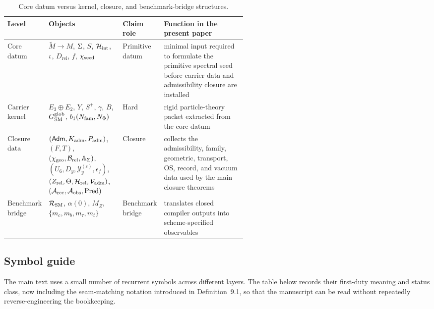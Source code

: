 \begin{table}[t]
\centering
\small
\begin{tabularx}{\linewidth}{@{}>{\raggedright\arraybackslash}p{0.12\linewidth}>{\raggedright\arraybackslash}p{0.31\linewidth}>{\raggedright\arraybackslash}p{0.13\linewidth}Y@{}}
\toprule
Level & Objects & Claim role & Function in the present paper \\
\midrule
Core datum & $\widetilde M\to M$, $\Sigma$, $S$, $\mathcal H_{\mathrm{int}}$, $\iota$, $D_{\mathrm{rel}}$, $f$, $\chi_{\mathrm{seed}}$ & Primitive datum & minimal input required to formulate the primitive spectral seed before carrier data and admissibility closure are installed \\
Carrier kernel & $E_3\oplus E_2$, $Y$, $S^+$, $\gamma$, $B$, $G_{\mathrm{SM}}^{\mathrm{glob}}$, $b_1(N_{\mathrm{fam}},N_\Phi)$ & Hard & rigid particle-theory packet extracted from the core datum \\
Closure data & $(\mathsf{Adm},K_{\mathrm{adm}},P_{\mathrm{adm}})$, $(F,T)$, $(\chi_{\mathrm{geo}},\mathcal B_{\mathrm{rel}},\mathbb A_{\Sigma})$, $(U_6,D_y,\mathcal Y_y^{(\varepsilon)},\epsilon_f)$, $(Z_{\mathrm{rel}},\Theta,\mathcal H_{\mathrm{rel}},\mathcal V_{\mathrm{adm}})$, $(\mathcal A_{\mathrm{rec}},\mathcal A_{\mathrm{obs}},\operatorname{Pred})$ & Closure & collects the admissibility, family, geometric, transport, OS, record, and vacuum data used by the main closure theorems \\
Benchmark bridge & $\mathcal R_{\mathrm{SM}}$, $\alpha(0)$, $M_Z$, $\{m_c,m_b,m_\tau,m_t\}$ & Benchmark bridge & translates closed compiler outputs into scheme-specified observables \\
\bottomrule
\end{tabularx}
\caption{Core datum versus kernel, closure, and benchmark-bridge structures.}
\label{tab:layered-datum}
\end{table}

\subsection{Symbol guide}

The main text uses a small number of recurrent symbols across different layers. The table below records their first-duty meaning and status class, now including the seam-matching notation introduced in Definition~9.1, so that the manuscript can be read without repeatedly reverse-engineering the bookkeeping.

